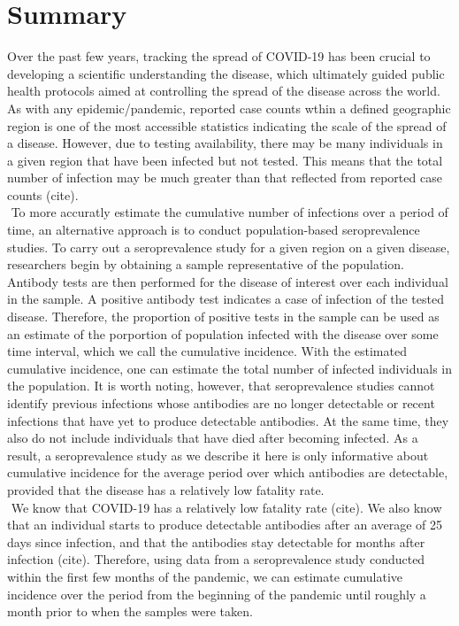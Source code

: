 \section{Summary}
Over the past few years, tracking the spread of COVID-19 has been crucial to developing a scientific understanding the disease, which ultimately guided public health protocols aimed at controlling the spread of the disease across the world. As with any epidemic/pandemic, reported case counts wthin a defined geographic region is one of the most accessible statistics indicating the scale of the spread of a disease. However, due to testing availability, there may be many individuals in a given region that have been infected but not tested. This means that the total number of infection may be much greater than that reflected from reported case counts (cite).\\
\newline$ $
To more accuratly estimate the cumulative number of infections over a period of time, an alternative approach is to conduct population-based seroprevalence studies. To carry out a seroprevalence study for a given region on a given disease, researchers begin by obtaining a sample representative of the population. Antibody tests are then performed for the disease of interest over each individual in the sample. A positive antibody test indicates a case of infection of the tested disease. Therefore, the proportion of positive tests in the sample can be used as an estimate of the porportion of population infected with the disease over some time interval, which we call the cumulative incidence. With the estimated cumulative incidence, one can estimate the total number of infected individuals in the population. It is worth noting, however, that seroprevalence studies cannot identify previous infections whose antibodies are no longer detectable or recent infections that have yet to produce detectable antibodies. At the same time, they also do not include individuals that have died after becoming infected. As a result, a seroprevalence study as we describe it here is only informative about cumulative incidence for the average period over which antibodies are detectable, provided that the disease has a relatively low fatality rate.\\
\newline$ $
We know that COVID-19 has a relatively low fatality rate (cite). We also know that an individual starts to produce detectable antibodies after an average of 25 days since infection, and that the antibodies stay detectable for months after infection (cite). Therefore, using data from a seroprevalence study conducted within the first few months of the pandemic, we can estimate cumulative incidence over the period from the beginning of the pandemic until roughly a month prior to when the samples were taken.\\
